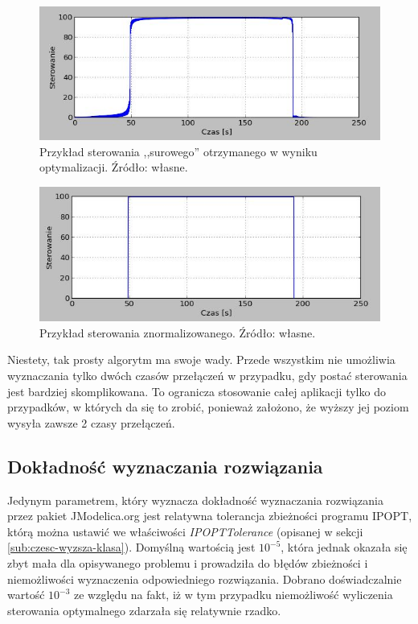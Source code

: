 \begin{figure}[ht]
    \centering
    \includegraphics[width=\textwidth]{Grafika/ctrl_30_30_30-20_25_20-raw}
    \caption{Przykład sterowania ,,surowego'' otrzymanego w wyniku optymalizacji. Źródło: własne.}
    \label{fig:ctrl-raw-example}
\end{figure}

\begin{figure}[ht]
    \centering
    \includegraphics[width=\textwidth]{Grafika/ctrl_30_30_30-20_25_20-normalised}
    \caption{Przykład sterowania znormalizowanego. Źródło: własne.}
    \label{fig:ctrl-normalised-example}
\end{figure}

Niestety, tak prosty algorytm ma swoje wady. Przede wszystkim nie umożliwia wyznaczania tylko dwóch czasów przełączeń w przypadku, gdy postać sterowania jest bardziej skomplikowana. To ogranicza stosowanie całej aplikacji tylko do przypadków, w których da się to zrobić, ponieważ założono, że wyższy jej poziom wysyła zawsze 2 czasy przełączeń.


\subsection{Dokładność wyznaczania rozwiązania}
\label{sub:opt-dokladnosc}

Jedynym parametrem, który wyznacza dokładność wyznaczania rozwiązania przez pakiet JModelica.org jest relatywna tolerancja zbieżności programu IPOPT, którą można ustawić we właściwości \emph{IPOPTTolerance} (opisanej w sekcji \ref{sub:czesc-wyzsza-klasa}). Domyślną wartością jest $10^{-5}$, która jednak okazała się zbyt mała dla opisywanego problemu i prowadziła do błędów zbieżności i niemożliwości wyznaczenia odpowiedniego rozwiązania. Dobrano doświadczalnie wartość $10^{-3}$ ze względu na fakt, iż w tym przypadku niemożliwość wyliczenia sterowania optymalnego zdarzała się relatywnie rzadko.

